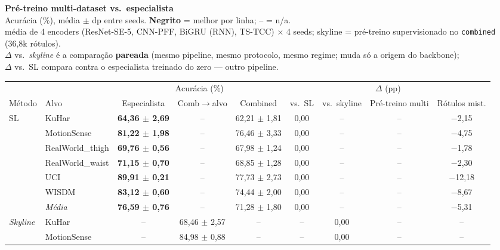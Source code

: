 \documentclass[border=8pt,varwidth=\maxdimen]{standalone}
\begin{document}
\centering
{\large\bfseries Pré-treino multi-dataset vs.\ especialista}\\[2pt]
{\scriptsize Acurácia (\%), média $\pm$ dp entre seeds. \textbf{Negrito} = melhor por linha; -- = n/a.}\\[1pt]
{\scriptsize média de 4 encoders (ResNet-SE-5, CNN-PFF, BiGRU (RNN), TS-TCC) × 4 seeds; skyline = pré-treino supervisionado no \texttt{combined} (36,8k rótulos).}\\[1pt]
{\scriptsize $\Delta$ vs.\ \emph{skyline} é a comparação \textbf{pareada} (mesmo pipeline, mesmo protocolo, mesmo regime; muda só a origem do backbone);}\\[-1pt]
{\scriptsize $\Delta$ vs.\ SL compara contra o especialista treinado do zero --- outro pipeline.}\\[6pt]
\begin{tabular}{llccccccc}
\toprule
& & \multicolumn{3}{c}{Acurácia (\%)} & \multicolumn{4}{c}{$\Delta$ (pp)}\\
\cmidrule(lr){3-5}\cmidrule(lr){6-9}
Método & Alvo & Especialista & Comb$\to$alvo & Combined & vs.\ SL & vs.\ skyline & Pré-treino multi & Rótulos mist.\\
\midrule
\multirow{7}{*}{SL}
 & KuHar           & \textbf{64{,}36 $\pm$ 2{,}69} & -- & 62{,}21 $\pm$ 1{,}81 & 0{,}00 & -- & -- & $-$2{,}15\\
 & MotionSense     & \textbf{81{,}22 $\pm$ 1{,}98} & -- & 76{,}46 $\pm$ 3{,}33 & 0{,}00 & -- & -- & $-$4{,}75\\
 & RealWorld\_thigh& \textbf{69{,}76 $\pm$ 0{,}56} & -- & 67{,}98 $\pm$ 1{,}24 & 0{,}00 & -- & -- & $-$1{,}78\\
 & RealWorld\_waist& \textbf{71{,}15 $\pm$ 0{,}70} & -- & 68{,}85 $\pm$ 1{,}28 & 0{,}00 & -- & -- & $-$2{,}30\\
 & UCI             & \textbf{89{,}91 $\pm$ 0{,}21} & -- & 77{,}73 $\pm$ 2{,}73 & 0{,}00 & -- & -- & $-$12{,}18\\
 & WISDM           & \textbf{83{,}12 $\pm$ 0{,}60} & -- & 74{,}44 $\pm$ 2{,}00 & 0{,}00 & -- & -- & $-$8{,}67\\
\cmidrule(lr){2-9}
 & \textit{Média}    & \textbf{76{,}59 $\pm$ 0{,}76} & -- & 71{,}28 $\pm$ 1{,}80 & 0{,}00 & -- & -- & $-$5{,}31\\
\midrule
\multirow{7}{*}{\emph{Skyline}}
 & KuHar           & -- & 68{,}46 $\pm$ 2{,}57 & -- & -- & 0{,}00 & -- & --\\
 & MotionSense     & -- & 84{,}98 $\pm$ 0{,}88 & -- & -- & 0{,}00 & -- & --\\

\end{tabular}
\end{document}

